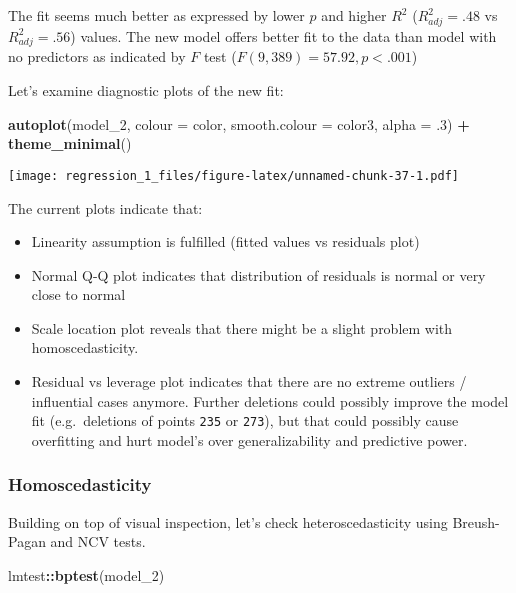 \documentclass[]{article}
\newenvironment{Shaded}{\begin{snugshade}}{\end{snugshade}}
\newcommand{\DataTypeTok}[1]{\textcolor[rgb]{0.13,0.29,0.53}{#1}}
\newcommand{\DecValTok}[1]{\textcolor[rgb]{0.00,0.00,0.81}{#1}}
\newcommand{\FloatTok}[1]{\textcolor[rgb]{0.00,0.00,0.81}{#1}}
\newcommand{\KeywordTok}[1]{\textcolor[rgb]{0.13,0.29,0.53}{\textbf{#1}}}
\newcommand{\NormalTok}[1]{#1}
\newcommand{\OperatorTok}[1]{\textcolor[rgb]{0.81,0.36,0.00}{\textbf{#1}}}
\newcommand{\StringTok}[1]{\textcolor[rgb]{0.31,0.60,0.02}{#1}}
\begin{document}
The fit seems much better as expressed by lower \(p\) and higher \(R^2\)
(\(R^2_{adj} = .48\) vs \(R^2_{adj} = .56\)) values. The new model
offers better fit to the data than model with no predictors as indicated
by \(F\) test (\(F(9, 389) = 57.92, p < .001\))

Let's examine diagnostic plots of the new fit:

\begin{Shaded}
\begin{Highlighting}[]
\KeywordTok{autoplot}\NormalTok{(model_}\DecValTok{2}\NormalTok{, }\DataTypeTok{colour =}\NormalTok{ color, }\DataTypeTok{smooth.colour =}\NormalTok{ color3, }\DataTypeTok{alpha =} \FloatTok{.3}\NormalTok{) }\OperatorTok{+}\StringTok{ }\KeywordTok{theme_minimal}\NormalTok{()}
\end{Highlighting}
\end{Shaded}

\texttt{[image: regression\_1\_files/figure-latex/unnamed-chunk-37-1.pdf]}

The current plots indicate that:

\begin{itemize}
\item
  Linearity assumption is fulfilled (fitted values vs residuals plot)
\item
  Normal Q-Q plot indicates that distribution of residuals is normal or
  very close to normal
\item
  Scale location plot reveals that there might be a slight problem with
  homoscedasticity.
\item
  Residual vs leverage plot indicates that there are no extreme outliers
  / influential cases anymore. Further deletions could possibly improve
  the model fit (e.g.~deletions of points \texttt{235} or \texttt{273}),
  but that could possibly cause overfitting and hurt model's over
  generalizability and predictive power.
\end{itemize}

\hypertarget{homoscedasticity}{%
\subsubsection{Homoscedasticity}\label{homoscedasticity}}

Building on top of visual inspection, let's check heteroscedasticity
using Breush-Pagan and NCV tests.

\begin{Shaded}
\begin{Highlighting}[]
\NormalTok{lmtest}\OperatorTok{::}\KeywordTok{bptest}\NormalTok{(model_}\DecValTok{2}\NormalTok{)}
\end{Highlighting}
\end{Shaded}
\end{document}
